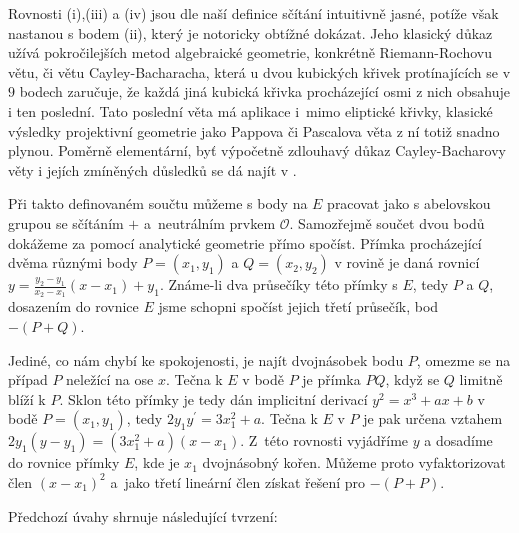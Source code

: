 \documentclass[12pt]{report}
\begin{document}
Rovnosti (i),(iii) a (iv) jsou dle naší definice sčítání intuitivně jasné, potíže však nastanou s bodem (ii), který je notoricky obtížné dokázat. Jeho klasický důkaz užívá pokročilejších metod algebraické geometrie, konkrétně Riemann-Rochovu větu, či větu Cayley-Bacharacha, která u dvou kubických křivek protínajících se v $9$ bodech zaručuje, že každá jiná kubická křivka procházející osmi z nich obsahuje i ten poslední. Tato poslední věta má aplikace i~mimo eliptické křivky, klasické výsledky projektivní geometrie jako Pappova či Pascalova věta z ní totiž snadno plynou. Poměrně elementární, byť výpočetně zdlouhavý důkaz Cayley-Bacharovy věty i jejích zmíněných důsledků se dá najít v \cite[Sec. 2.3]{Washington}.

Při takto definovaném součtu můžeme s body na $E$ pracovat jako s abelovskou grupou se sčítáním $+$ a~neutrálním prvkem $\mathcal{O}$. Samozřejmě součet dvou bodů dokážeme za pomocí analytické geometrie přímo spočíst. Přímka procházející dvěma různými body $P = (x_1,y_1)$ a $Q = (x_2,y_2)$ v rovině je daná rovnicí $y = \frac{y_2-y_1}{x_2-x_1} (x-x_1) + y_1$. Známe-li dva průsečíky této přímky s $E$, tedy $P$ a $Q$, dosazením do rovnice $E$ jsme schopni spočíst jejich třetí průsečík, bod $-(P+Q)$. 

Jediné, co nám chybí ke spokojenosti, je najít dvojnásobek bodu $P$, omezme se na případ $P$ neležící na ose $x$. Tečna k $E$ v bodě $P$ je přímka $PQ$, když se $Q$ limitně blíží k $P$. Sklon této přímky je tedy dán implicitní derivací $y^2 = x^3+ax+b$ v bodě $P = (x_1,y_1)$, tedy $2 y_1 y^\prime =3x_1 ^2 + a$. Tečna k $E$ v $P$ je pak určena vztahem $2y_1(y-y_1) = (3x_1 ^2+a)(x-x_1)$. Z~této rovnosti vyjádříme $y$ a dosadíme do rovnice přímky $E$, kde je $x_1$ dvojnásobný kořen. Můžeme proto vyfaktorizovat člen $(x-x_1)^2$ a~jako třetí lineární člen získat řešení pro $-(P+P)$.

Předchozí úvahy shrnuje následující tvrzení: 
\end{document}
